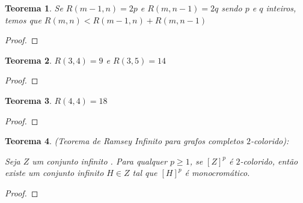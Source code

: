 \documentclass{article}
\newtheorem{teor}{Teorema}[section]
\begin{document}
\begin{teor}
    Se $R(m-1, n) = 2p$ e $R(m, n-1) = 2q$ sendo $p$ e $q$ inteiros, temos que $R(m, n) < R(m-1, n) + R(m, n-1)$
\end{teor}

\begin{proof}

\end{proof}


\begin{teor}
    $R(3, 4) = 9$ e $R(3, 5) = 14$
\end{teor}

\begin{proof}

\end{proof}


\begin{teor}
    $R(4, 4) = 18$
\end{teor}

\begin{proof}

\end{proof}


\begin{teor}
    (Teorema de Ramsey Infinito para grafos completos $2$\emph{-colorido}):

    Seja $Z$ um conjunto infinito . Para qualquer $p \ge 1$, se $[Z]^p$ é $2$\emph{-colorido}, então existe um conjunto infinito $H \in Z$ tal que $[H]^p$ é monocromático.
\end{teor}

\begin{proof}

\end{proof}
\end{document}
